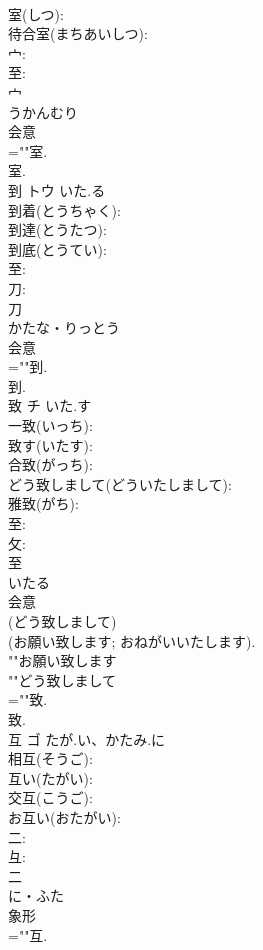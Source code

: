 \documentclass[8pt]{extreport}
\begin{document}
\begin{CJK}{UTF8}{min}
\\	室(しつ): 
\\	待合室(まちあいしつ): 
\\	宀: 
\\	至: 
\\	宀	
\\	うかんむり	
\\	会意 
\\	=""室.
\\	室.
\\	到	トウ	いた.る		
\\	到着(とうちゃく): 
\\	到達(とうたつ): 
\\	到底(とうてい): 
\\	至: 
\\	刀: 
\\	刀	
\\	かたな・りっとう	
\\	会意 
\\	=""到.
\\	到.
\\	致	チ	いた.す		
\\	一致(いっち): 
\\	致す(いたす): 
\\	合致(がっち): 
\\	どう致しまして(どういたしまして): 
\\	雅致(がち): 
\\	至: 
\\	攵: 
\\	至	
\\	いたる	
\\	会意 
\\	(どう致しまして) 
\\	(お願い致します; おねがいいたします). 
\\	""お願い致します
\\	""どう致しまして
\\	=""致.
\\	致.
\\	互	ゴ	たが.い、かたみ.に		
\\	相互(そうご): 
\\	互い(たがい): 
\\	交互(こうご): 
\\	お互い(おたがい): 
\\	二: 
\\	彑: 
\\	二	
\\	に・ふた	
\\	象形 
\\	=""互.

\end{CJK}
\end{document}
